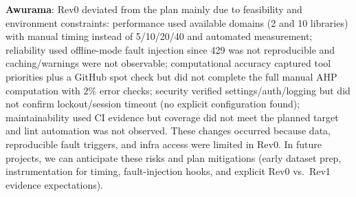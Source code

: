\documentclass[12pt, titlepage]{article}
\begin{document}
\begin{enumerate}
  \textbf{Awurama}: Rev0 deviated from the plan mainly due to feasibility and environment constraints: performance used available domains (2 and 10 libraries) with manual timing instead of 5/10/20/40 and automated measurement; reliability used offline-mode fault injection since 429 was not reproducible and caching/warnings were not observable; computational accuracy captured tool priorities plus a GitHub spot check but did not complete the full manual AHP computation with $2\%$ error checks; security verified settings/auth/logging but did not confirm lockout/session timeout (no explicit configuration found); maintainability used CI evidence but coverage did not meet the planned target and lint automation was not observed. These changes occurred because data, reproducible fault triggers, and infra access were limited in Rev0. In future projects, we can anticipate these risks and plan mitigations (early dataset prep, instrumentation for timing, fault-injection hooks, and explicit Rev0 vs.\ Rev1 evidence expectations).

\end{enumerate}
\end{document}
